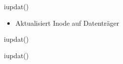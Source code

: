 \documentclass{beamer}
\begin{document}
\begin{frame}{iupdat()}
    \begin{itemize}
        \item Aktualisiert Inode auf Datenträger
    \end{itemize}
\end{frame}

\begin{frame}{iupdat()}
\end{frame}

\begin{frame}{iupdat()}
\end{frame}
\end{document}
